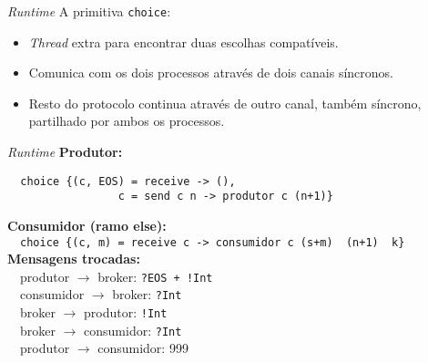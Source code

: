 \begin{frame}{\textit{Runtime}}
  A primitiva \lstinline|choice|:
  \begin{itemize}
  \item \textit{Thread} extra para encontrar duas escolhas compatíveis.
  \item Comunica com os dois processos através de dois canais síncronos.
  \item Resto do protocolo continua através de outro canal, também síncrono, partilhado por ambos os processos.
  \end{itemize}
\end{frame}

\begin{frame}[fragile]{\textit{Runtime}}
  \textbf{Produtor:}\\
  \begin{lstlisting}
  choice {(c, EOS) = receive -> (),
                 c = send c n -> produtor c (n+1)}
\end{lstlisting}

\textbf{Consumidor (ramo else):}\\
$\quad$\lstinline|choice {(c, m) = receive c -> consumidor c (s+m)  (n+1)  k}|\\
\vspace{3mm}
\textbf{Mensagens trocadas:}\\
$\quad$produtor $\rightarrow$ broker: \lstinline|?EOS + !Int|\\
$\quad$consumidor $\rightarrow$ broker: \lstinline|?Int|\\
$\quad$broker $\rightarrow$ produtor: \lstinline|!Int|\\
$\quad$broker $\rightarrow$ consumidor: \lstinline|?Int|\\
$\quad$produtor $\rightarrow$ consumidor: 999

\end{frame}


